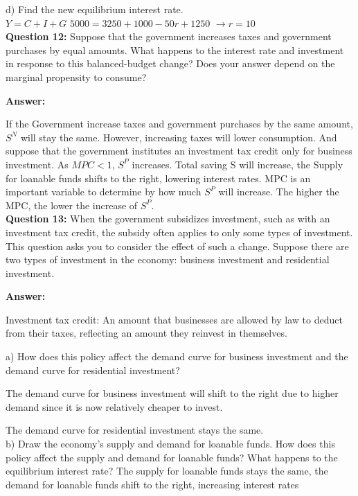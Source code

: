 \documentclass[a4paper, 11pt]{article}
\begin{document}
d) Find the new equilibrium interest rate.\\
$Y = C + I + G$
$5000 = 3250 + 1000 - 50r + 1250$
$\rightarrow r = 10$ 
\\

\textbf{Question 12:} Suppose that the government increases taxes and government purchases by equal amounts. What happens to the interest rate and investment in response to this balanced-budget change? Does your answer depend on the marginal propensity to consume?

\textbf{Answer:} 

If the Government increase taxes and government purchases by the same amount, $S^{N}$ will stay the same. However, increasing taxes will lower consumption. And suppose that the government institutes an investment tax credit only for business investment. As $MPC < 1$, $S^{P}$ increases. Total saving S will increase, the Supply for loanable funds shifts to the right, lowering interest rates. MPC is an important variable to determine by how much $S^{P}$ will increase. The higher the MPC, the lower the increase of $S^{P}$. \\

\textbf{Question 13:} When the government subsidizes investment, such as with an investment tax credit, the subsidy often applies to only some types of investment. This question asks you to consider the effect of such a change. Suppose there are two types of investment in the economy: business investment and residential investment.

\textbf{Answer:}

Investment tax credit: An amount that businesses are allowed by law to deduct from their taxes, reflecting an amount they reinvest in themselves.

a) How does this policy affect the demand curve for business investment and the demand curve for residential investment?

The demand curve for business investment will shift to the right due to higher demand since it is now relatively cheaper to invest.

The demand curve for residential investment stays the same. \\

b) Draw the economy’s supply and demand for loanable funds. How does this policy affect the supply and demand for loanable funds? What happens to the equilibrium interest rate?
The supply for loanable funds stays the same, the demand for loanable funds shift to the right, increasing interest rates \\
\end{document}
